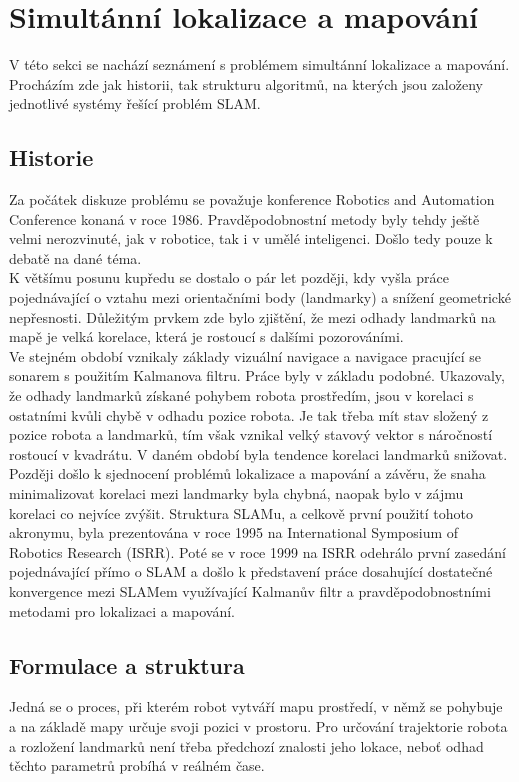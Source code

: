 \documentclass[12pt]{article}
\begin{document}
\newpage

\section{Simultánní lokalizace a mapování}

V této sekci se nachází seznámení s problémem simultánní lokalizace a mapování. Procházím zde jak historii, tak strukturu algoritmů, na kterých jsou založeny jednotlivé systémy řešící problém SLAM. 

\subsection{Historie}
Za počátek diskuze problému se považuje konference Robotics and Automation Conference konaná v roce 1986. Pravděpodobnostní metody byly tehdy ještě velmi nerozvinuté, jak v robotice, tak i v umělé inteligenci. Došlo tedy pouze k debatě na dané téma.\\
\indent K většímu posunu kupředu se dostalo o pár let později, kdy vyšla práce pojednávající o vztahu mezi orientačními body (landmarky) a snížení geometrické nepřesnosti. Důležitým prvkem zde bylo zjištění, že mezi odhady landmarků na mapě je velká korelace, která je rostoucí s dalšími pozorováními.\\
\indent Ve stejném období vznikaly základy vizuální navigace a navigace pracující se sonarem s použitím Kalmanova filtru. Práce byly v základu podobné. Ukazovaly, že odhady landmarků získané pohybem robota prostředím, jsou v korelaci s ostatními kvůli chybě v odhadu pozice robota. Je tak třeba mít stav složený z pozice robota a landmarků, tím však vznikal velký stavový vektor s náročností rostoucí v kvadrátu. V daném období byla tendence korelaci landmarků snižovat.\\
\indent Později došlo k sjednocení problémů lokalizace a mapování a závěru, že snaha minimalizovat korelaci mezi landmarky byla chybná, naopak bylo v zájmu korelaci co nejvíce zvýšit. Struktura SLAMu, a celkově první použití tohoto akronymu, byla prezentována v roce 1995 na International Symposium of Robotics Research (ISRR). Poté se v roce 1999 na ISRR odehrálo první zasedání pojednávající přímo o SLAM a došlo k představení práce dosahující dostatečné konvergence mezi SLAMem využívající Kalmanův filtr a pravděpodobnostními metodami pro lokalizaci a mapování.


\subsection{Formulace a struktura} 
Jedná se o proces, při kterém robot vytváří mapu prostředí, v němž se pohybuje a na základě mapy určuje svoji pozici v prostoru. Pro určování trajektorie robota a rozložení landmarků není třeba předchozí znalosti jeho lokace, neboť odhad těchto parametrů probíhá v reálném čase. 
\end{document}
